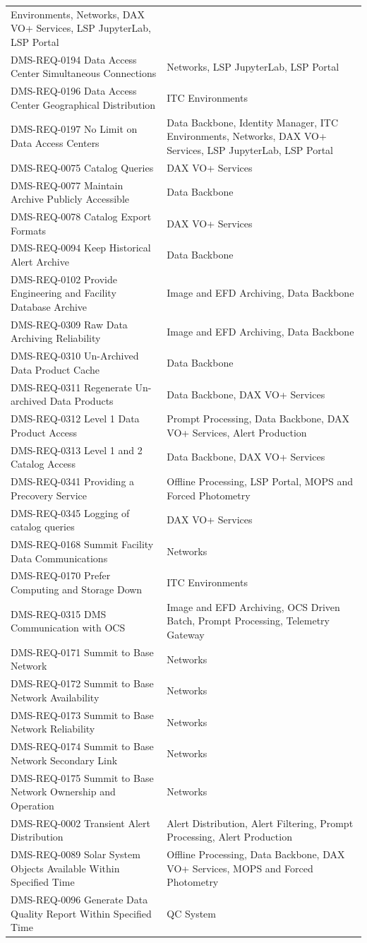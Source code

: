 \documentclass[]{article}
\begin{document}
\begin{longtable}[]{@{}ll@{}}
Environments, Networks, DAX VO+ Services, LSP JupyterLab, LSP
Portal\tabularnewline
DMS-REQ-0194 Data Access Center Simultaneous Connections & Networks, LSP
JupyterLab, LSP Portal\tabularnewline
DMS-REQ-0196 Data Access Center Geographical Distribution & ITC
Environments\tabularnewline
DMS-REQ-0197 No Limit on Data Access Centers & Data Backbone, Identity
Manager, ITC Environments, Networks, DAX VO+ Services, LSP JupyterLab,
LSP Portal\tabularnewline
DMS-REQ-0075 Catalog Queries & DAX VO+ Services\tabularnewline
DMS-REQ-0077 Maintain Archive Publicly Accessible & Data
Backbone\tabularnewline
DMS-REQ-0078 Catalog Export Formats & DAX VO+ Services\tabularnewline
DMS-REQ-0094 Keep Historical Alert Archive & Data
Backbone\tabularnewline
DMS-REQ-0102 Provide Engineering and Facility Database Archive & Image
and EFD Archiving, Data Backbone\tabularnewline
DMS-REQ-0309 Raw Data Archiving Reliability & Image and EFD Archiving,
Data Backbone\tabularnewline
DMS-REQ-0310 Un-Archived Data Product Cache & Data
Backbone\tabularnewline
DMS-REQ-0311 Regenerate Un-archived Data Products & Data Backbone, DAX
VO+ Services\tabularnewline
DMS-REQ-0312 Level 1 Data Product Access & Prompt Processing, Data
Backbone, DAX VO+ Services, Alert Production\tabularnewline
DMS-REQ-0313 Level 1 and 2 Catalog Access & Data Backbone, DAX VO+
Services\tabularnewline
DMS-REQ-0341 Providing a Precovery Service & Offline Processing, LSP
Portal, MOPS and Forced Photometry\tabularnewline
DMS-REQ-0345 Logging of catalog queries & DAX VO+
Services\tabularnewline
DMS-REQ-0168 Summit Facility Data Communications &
Networks\tabularnewline
DMS-REQ-0170 Prefer Computing and Storage Down & ITC
Environments\tabularnewline
DMS-REQ-0315 DMS Communication with OCS & Image and EFD Archiving, OCS
Driven Batch, Prompt Processing, Telemetry Gateway\tabularnewline
DMS-REQ-0171 Summit to Base Network & Networks\tabularnewline
DMS-REQ-0172 Summit to Base Network Availability &
Networks\tabularnewline
DMS-REQ-0173 Summit to Base Network Reliability &
Networks\tabularnewline
DMS-REQ-0174 Summit to Base Network Secondary Link &
Networks\tabularnewline
DMS-REQ-0175 Summit to Base Network Ownership and Operation &
Networks\tabularnewline
DMS-REQ-0002 Transient Alert Distribution & Alert Distribution, Alert
Filtering, Prompt Processing, Alert Production\tabularnewline
DMS-REQ-0089 Solar System Objects Available Within Specified Time &
Offline Processing, Data Backbone, DAX VO+ Services, MOPS and Forced
Photometry\tabularnewline
DMS-REQ-0096 Generate Data Quality Report Within Specified Time & QC
System\tabularnewline

\end{longtable}
\end{document}
